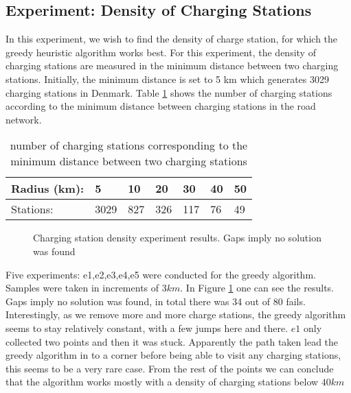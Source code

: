 \subsection{Experiment: Density of Charging Stations}
In this experiment, we wish to find the density of charge station, for which the greedy heuristic algorithm works best. For this experiment, the density of charging stations are measured in the minimum distance between two charging stations. Initially, the minimum distance is set to 5 km which generates 3029 charging stations in Denmark. Table \ref{table:chargedensity} shows the number of charging stations according to the minimum distance between charging stations in the road network.

\begin{table}[!htb]
\centering
		\begin{tabular}{ p{1.85cm} p{0.67cm} p{0.63cm} p{0.63cm} p{0.63cm} p{0.63cm} p{0.63cm} } \hline
		Radius (km): & 5 & 10 & 20 & 30 & 40 & 50 \\ \hline
		Stations: & 3029 & 827 & 326 & 117 & 76 & 49 \\ \hline 
		\end{tabular}
		\caption{number of charging stations corresponding to the minimum distance between two charging stations}
	\label{table:chargedensity}
	\end{table}


\begin{figure}[!htb]
\centering
{}
\caption{Charging station density experiment results. Gaps imply no solution was found} 
\label{fig:cs_desnity}
\end{figure}


Five experiments: e1,e2,e3,e4,e5 were conducted for the greedy algorithm. Samples were taken in increments of $3\si{km}$. In Figure \ref{fig:cs_desnity} one can see the results. Gaps imply no solution was found, in total there was 34 out of 80 fails. Interestingly, as we remove more and more charge stations, the greedy algorithm seems to stay relatively constant, with a few jumps here and there. $e1$ only collected two points and then it was stuck. Apparently the path taken lead the greedy algorithm in to a corner before being able to visit any charging stations, this seems to be a very rare case. From the rest of the points we can conclude that the algorithm works mostly with a density of charging stations below $40\si{km}$

